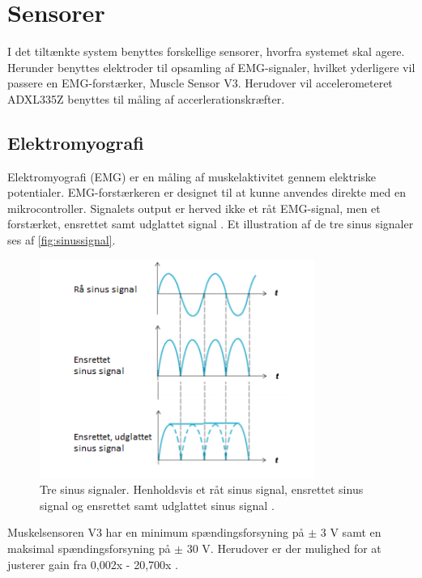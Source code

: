 \section{Sensorer} \label{sec:sensorer}
I det tiltænkte system benyttes forskellige sensorer, hvorfra systemet skal agere. Herunder benyttes elektroder til opsamling af EMG-signaler, hvilket yderligere vil passere en EMG-forstærker, Muscle Sensor V3. Herudover vil accelerometeret ADXL335Z benyttes til måling af accerlerationskræfter.

\subsection{Elektromyografi}
Elektromyografi (EMG) er en måling af muskelaktivitet gennem elektriske potentialer. 
EMG-forstærkeren er designet til at kunne anvendes direkte med en mikrocontroller. Signalets output er herved ikke et råt EMG-signal, men et forstærket, ensrettet samt udglattet signal \citep{advancertech2013}. Et illustration af de tre sinus signaler ses af \autoref{fig:sinussignal}.

\begin{figure}[H]
\centering
\includegraphics[width=0.8\textwidth]{figures/sinussignal.png}
\caption{Tre sinus signaler. Henholdsvis et råt sinus signal, ensrettet sinus signal og ensrettet samt udglattet sinus signal \citep{advancertech2013}.}
\label{fig:sinussignal}
\end{figure}

Muskelsensoren V3 har en minimum spændingsforsyning på $\pm$ 3 V samt en maksimal spændingsforsyning på $\pm$ 30 V. Herudover er der mulighed for at justerer gain fra 0,002x - 20,700x \citep{advancertech2013}.




